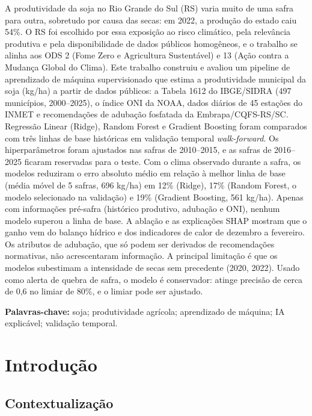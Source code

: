 \documentclass[12pt]{article}
\begin{document}
\begin{resumo}
  A produtividade da soja no Rio Grande do Sul (RS) varia muito de uma safra
  para outra, sobretudo por causa das secas: em 2022, a produção do estado
  caiu 54\%. O RS foi escolhido por essa exposição ao risco climático, pela
  relevância produtiva e pela disponibilidade de dados públicos homogêneos, e
  o trabalho se alinha aos ODS 2 (Fome Zero e Agricultura Sustentável) e 13
  (Ação contra a Mudança Global do Clima). Este trabalho construiu e
  avaliou um pipeline de aprendizado de máquina supervisionado que estima a
  produtividade municipal da soja (kg/ha) a partir de dados públicos: a
  Tabela 1612 do IBGE/SIDRA (497 municípios, 2000--2025), o índice ONI da
  NOAA, dados diários de 45 estações do INMET e recomendações de adubação
  fosfatada da Embrapa/CQFS-RS/SC. Regressão Linear (Ridge), Random Forest e
  Gradient Boosting foram comparados com três linhas de base históricas em
  validação temporal \emph{walk-forward}. Os hiperparâmetros foram ajustados
  nas safras de 2010--2015, e as safras de 2016--2025 ficaram reservadas para
  o teste. Com o clima observado durante a safra, os modelos reduziram o erro
  absoluto médio em relação à melhor linha de base (média móvel de 5 safras,
  696 kg/ha) em 12\% (Ridge), 17\% (Random Forest, o modelo selecionado na
  validação) e 19\% (Gradient Boosting, 561 kg/ha). Apenas com informações
  pré-safra (histórico produtivo, adubação e ONI), nenhum modelo superou a
  linha de base. A ablação e as explicações SHAP mostram que o ganho vem do
  balanço hídrico e dos indicadores de calor de dezembro a fevereiro. Os
  atributos de adubação, que só podem ser derivados de recomendações
  normativas, não acrescentaram informação. A principal limitação é que os
  modelos subestimam a intensidade de secas sem precedente (2020, 2022).
  Usado como alerta de quebra de safra, o modelo é conservador: atinge
  precisão de cerca de 0,6 no limiar de 80\%, e o limiar pode ser ajustado.

  \noindent\textbf{Palavras-chave:} soja; produtividade agrícola;
  aprendizado de máquina; IA explicável; validação temporal.
\end{resumo}

\section{Introdução}

\subsection{Contextualização}
\end{document}
